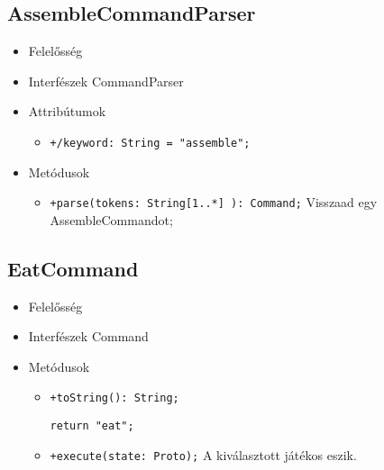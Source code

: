 \subsection{AssembleCommandParser}
\begin{itemize}
\item Felelősség\newline
\item Interfészek\newline
CommandParser
\item Attribútumok
	\begin{itemize}
		\item \texttt{+/keyword: String = "assemble";}
	\end{itemize}
\item Metódusok
\begin{itemize}
		\item \texttt{+parse(tokens: String[1..*] ): Command;} \newline
		Visszaad egy AssembleCommandot;
	\end{itemize}
\end{itemize}

\subsection{EatCommand}
\begin{itemize}
\item Felelősség\newline
\item Interfészek\newline
Command
\item Metódusok
\begin{itemize}
		\item \texttt{+toString(): String;}
		\begin{lstlisting}
return "eat";
		\end{lstlisting}
		\item \texttt{+execute(state: Proto);} \newline
		A kiválasztott játékos eszik.
	\end{itemize}
\end{itemize}
